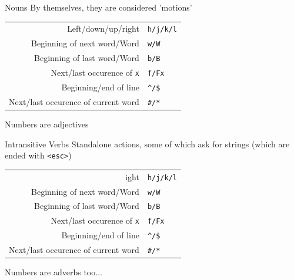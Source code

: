 \documentclass{beamer}
\begin{document}
            \begin{frame}{Nouns}
                By themselves, they are considered 'motions'
                \begin{table}
                    \centering
                    \begin{tabular}{r|p{7cm}}
                        Left/down/up/right & \texttt{h/j/k/l} \\[.3cm]
                        Beginning of next word/Word & \texttt{w/W} \\[.3cm]
                        Beginning of last word/Word & \texttt{b/B} \\[.3cm]
                        Next/last occurence of \texttt{x} & \texttt{f/Fx} \\[.3cm]
                        Beginning/end of line & \texttt{\textasciicircum /\$ } \\[.3cm]
                        Next/last occurence of current word & \texttt{\#/*} \\
                    \end{tabular}
                \end{table}
                Numbers are adjectives
            \end{frame}

            \begin{frame}{Intransitive Verbs}
                Standalone actions, some of which ask for strings (which are ended with \texttt{<esc>})
                \begin{table}
                    \centering
                    \begin{tabular}{r|p{7cm}}
                        ight & \texttt{h/j/k/l} \\[.3cm]
                        Beginning of next word/Word & \texttt{w/W} \\[.3cm]
                        Beginning of last word/Word & \texttt{b/B} \\[.3cm]
                        Next/last occurence of \texttt{x} & \texttt{f/Fx} \\[.3cm]
                        Beginning/end of line & \texttt{\textasciicircum /\$ } \\[.3cm]
                        Next/last occurence of current word & \texttt{\#/*} \\
                    \end{tabular}
                \end{table}
                Numbers are adverbs too...
            \end{frame}
\end{document}
